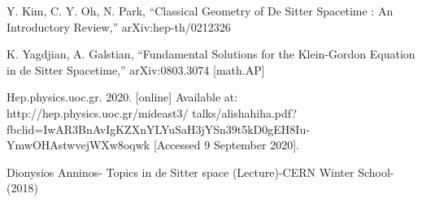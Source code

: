 \documentclass[a4paper,11pt]{article}
\numberwithin{equation}{section}
\numberwithin{figure}{section}
\begin{document}
\begin{large}
\begin{thebibliography}{}
    Y. Kim, C. Y. Oh, N. Park, “Classical Geometry of De Sitter Spacetime : An Introductory Review,” 	arXiv:hep-th/0212326
    
    K. Yagdjian, A. Galstian, “Fundamental Solutions for the Klein-Gordon Equation in de Sitter Spacetime,” 	arXiv:0803.3074 [math.AP]
    
    Hep.physics.uoc.gr. 2020. [online] Available at: http://hep.physics.uoc.gr/mideast3/
    talks/alishahiha.pdf?fbclid=IwAR3BnAvIgKZXnYLYuSaH3jYSn39t5kD0gEH8Iu-YmwOHAstwvejWXw8oqwk [Accessed 9 September 2020].
    
    Dionysios Anninos- Topics in de Sitter space (Lecture)-CERN Winter School- (2018)
    
\end{thebibliography}




\end{large}
\end{document}

